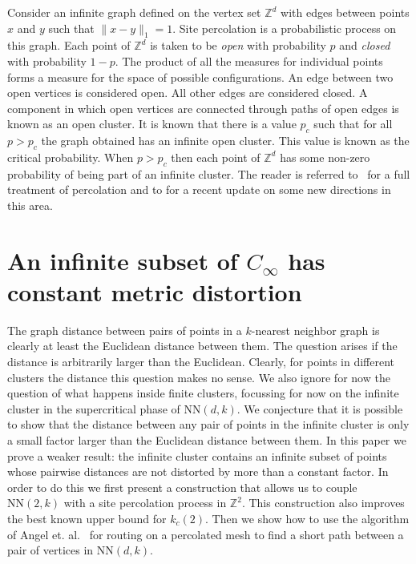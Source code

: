 \documentclass[11pt]{article}
\def\ZZ{\mathbb{Z}}
\def\NN{\mbox{NN}}
\begin{document}
 Consider an infinite graph defined on
the vertex set $\ZZ^d$ with edges between points $x$ and $y$ such that
$\| x - y\|_1 = 1$. Site percolation is a probabilistic process
on this graph. Each point of $\ZZ^d$ is taken to be {\em open} with
probability $p$ and {\em closed} with probability $1 - p$. The product
of all the measures for individual points forms a measure for the
space of possible configurations. An edge between two open vertices is
considered open. All other edges are considered closed. A component in
which open vertices are connected through paths of open edges is known
as an open cluster. It is known that there is a value $p_c$ such that
for all $p > p_c$ the graph obtained has an infinite open
cluster. This value is known as the critical probability. When $p >
p_c$ then each point of $\ZZ^d$ has some non-zero probability of being
part of an infinite cluster. The reader is referred
to~\cite{grimmett:1999} for a full treatment of percolation and to
\cite{bollobas:2006} for a recent update on some new directions in
this area.




\section{An infinite subset of $C_\infty$ has constant metric
  distortion} 
\label{sec:metric}

The graph distance between pairs of points in a $k$-nearest neighbor
graph is clearly at least the Euclidean distance between them. The
question arises if the distance is arbitrarily larger than the
Euclidean. Clearly, for points in different clusters the distance this
question makes no sense. We also ignore for now the question of what
happens inside finite clusters, focussing for now on the infinite
cluster in the supercritical phase of $\NN(d,k)$. We conjecture that
it is possible to show that the distance between any pair of points in
the infinite cluster is only a small factor larger than the Euclidean
distance between them. In this paper we prove a weaker result: the
infinite cluster contains an infinite subset of points whose pairwise
distances are not distorted by more than a constant factor. In order
to do this we first present a construction that allows us to couple
$\NN(2,k)$ with a site percolation process in $\ZZ^2$. This
construction also improves the best known upper bound for
$k_c(2)$. Then we show how to use the algorithm of Angel
et. al.~\cite{angel-podc:2005} for routing on a percolated mesh to
find a short path between a pair of vertices in $\NN(d,k)$.
\end{document}
